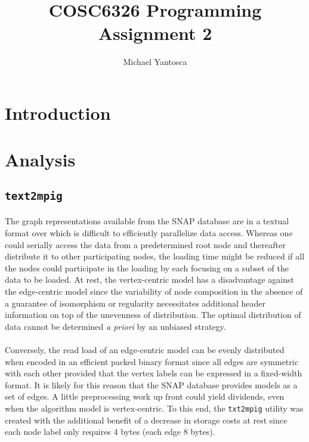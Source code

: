 \documentclass[11pt,epsf]{article}
\date{}
\title{COSC6326 Programming Assignment 2}
\author{Michael Yantosca}
\newcommand{\TODO}[0]{\textbf{\color{red}{TODO}}}
\begin{document}
\maketitle
\tableofcontents

\section{Introduction}{
  \paragraph{}{
    \TODO
  }
}

\section{Analysis}{
  \subsection{\texttt{text2mpig}}{
    \paragraph{}{
      The graph representations available from the SNAP database\autocite{SNAP} are in a textual format
      over which is difficult to efficiently parallelize data access. Whereas one could serially access
      the data from a predetermined root node and thereafter distribute it to other participating nodes,
      the loading time might be reduced if all the nodes could participate in the loading by each focusing
      on a subset of the data to be loaded. At rest, the vertex-centric model has a disadvantage against
      the edge-centric model since the variability of node composition in the absence of a guarantee of
      isomorphism or regularity necessitates additional header information on top of the unevenness of
      distribution. The optimal distribution of data cannot be determined \emph{a priori} by an unbiased
      strategy.
    }
    \paragraph{}{
      Conversely, the read load of an edge-centric model can be evenly distributed when
      encoded in an efficient packed binary format since all edges are symmetric with each
      other provided that the vertex labels can be expressed in a fixed-width format. It is
      likely for this reason that the SNAP database provides models as a set of edges. A
      little preprocessing work up front could yield dividends, even when the algorithm
      model is vertex-centric. To this end, the \texttt{txt2mpig} utility was created with
      the additional benefit of a decrease in storage costs at rest since each node label
      only requires 4 bytes (each edge 8 bytes).
    }
}}
\end{document}

